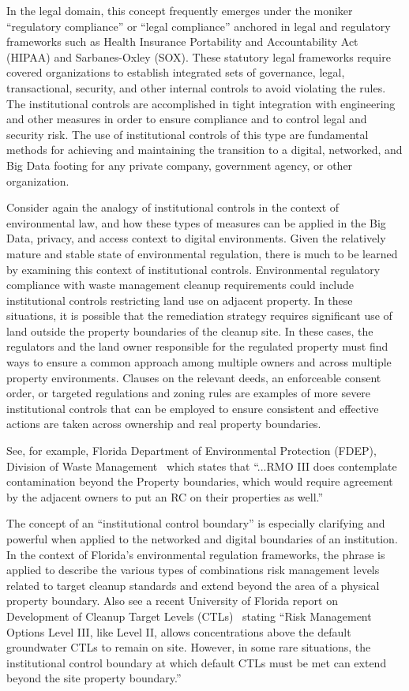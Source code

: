 In the legal domain, this concept frequently emerges under the moniker ``regulatory compliance'' or ``legal compliance'' anchored in legal and regulatory frameworks such as Health Insurance Portability and Accountability Act (HIPAA) and Sarbanes-Oxley (SOX).
These statutory legal frameworks require covered organizations to establish integrated sets of governance, legal, transactional, security, and other internal controls to avoid violating the rules.
The institutional controls are accomplished in tight integration with engineering and other measures in order to ensure compliance and to control legal and security risk.
The use of institutional controls of this type are fundamental methods for achieving and maintaining the transition to a digital, networked, and Big Data footing for any private company, government agency, or other organization.

Consider again the analogy of institutional controls in the context of environmental law, and how these types of measures can be applied in the Big Data, privacy, and access context to digital environments.
Given the relatively mature and stable state of environmental regulation, there is much to be learned by examining this context of institutional controls.
Environmental regulatory compliance with waste management cleanup requirements could include institutional controls restricting land use on adjacent property.
In these situations, it is possible that the remediation strategy requires significant use of land outside the property boundaries of the cleanup site. 
In these cases, the regulators and the land owner responsible for the regulated property must find ways to ensure a common approach among multiple owners and across multiple property environments.
Clauses on the relevant deeds, an enforceable consent order, or targeted regulations and zoning rules are examples of more severe institutional controls that can be employed to ensure consistent and effective actions are taken across ownership and real property boundaries.

See, for example, Florida Department of Environmental Protection (FDEP), Division of Waste Management~\cite{FloridaEPA2012} which states that
``...RMO III does contemplate contamination beyond the Property boundaries, which would require agreement by the adjacent owners to put an RC on their properties as well.''

The concept of an ``institutional control boundary'' is especially clarifying and powerful when applied to the networked and digital boundaries of an institution.
In the context of Florida's environmental regulation frameworks, the phrase is applied to describe the various types of combinations risk management levels related to target cleanup standards and extend beyond the area of a physical property boundary.
Also see a recent University of Florida report on Development of Cleanup Target Levels (CTLs)~\cite{UFlorida2005} stating
``Risk Management Options Level III, like Level II, allows concentrations above the default groundwater CTLs to remain on site.
However, in some rare situations, the institutional control boundary at which default CTLs must be met can extend beyond the site property boundary.''

